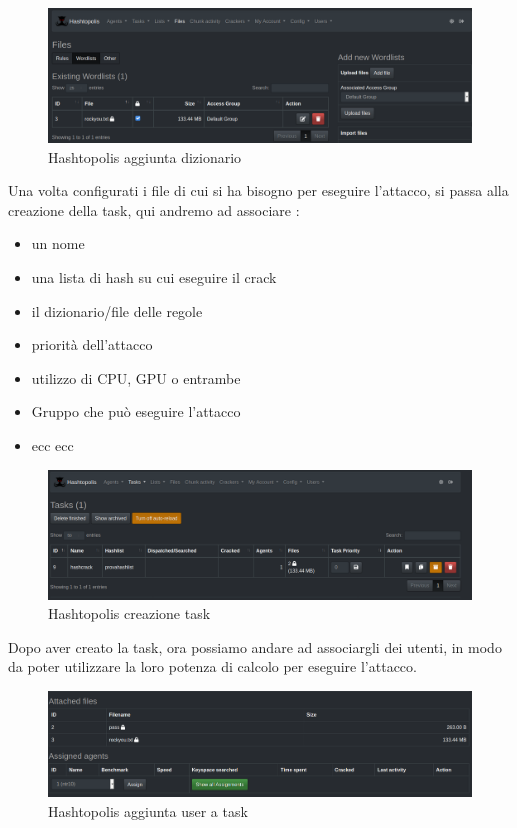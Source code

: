 \begin{figure}[ht]
    \centering
    \includegraphics[width=\linewidth]{Immagini/8/hashtopolis_3.png}
    \caption{Hashtopolis aggiunta dizionario}
\end{figure}

Una volta configurati i file di cui si ha bisogno per eseguire l'attacco, si passa alla creazione della task, qui andremo ad associare :
\begin{itemize}
    \item un nome
    \item una lista di hash su cui eseguire il crack
    \item il dizionario/file delle regole
    \item priorità dell'attacco
    \item utilizzo di CPU, GPU o entrambe
    \item Gruppo che può eseguire l'attacco 
    \item ecc ecc 
\end{itemize}

\begin{figure}[ht]
    \centering
    \includegraphics[width=\linewidth]{Immagini/8/hashtopolis_1.png}
    \caption{Hashtopolis creazione task}
\end{figure}

Dopo aver creato la task, ora possiamo andare ad associargli dei utenti, in modo da poter utilizzare la loro potenza di calcolo per eseguire l'attacco.

\begin{figure}[ht]
    \centering
    \includegraphics[width=\linewidth]{Immagini/8/hashtopolis_4.png}
    \caption{Hashtopolis aggiunta user a task}
\end{figure}

